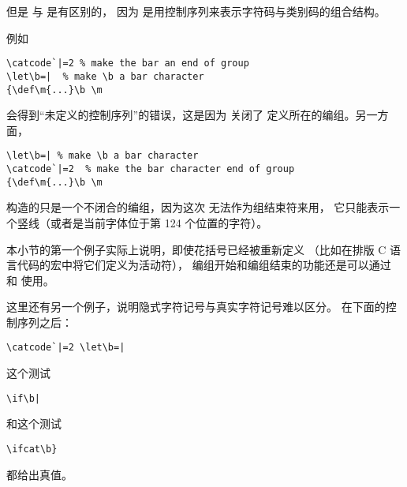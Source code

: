 \documentclass{book}
\begin{document}
但是  与  是有区别的，
因为  是用控制序列来表示字符码与类别码的组合结构。

例如
\begin{verbatim}
\catcode`|=2 % make the bar an end of group
\let\b=|  % make \b a bar character
{\def\m{...}\b \m
\end{verbatim}
会得到“未定义的控制序列”的错误，这是因为  关闭了 
定义所在的编组。另一方面，
\begin{verbatim}
\let\b=| % make \b a bar character
\catcode`|=2  % make the bar character end of group
{\def\m{...}\b \m
\end{verbatim}
构造的只是一个不闭合的编组，因为这次  无法作为组结束符来用，
它只能表示一个竖线（或者是当前字体位于第 124 个位置的字符）。

本小节的第一个例子实际上说明，即使花括号已经被重新定义%
（比如在排版 C 语言代码的宏中将它们定义为活动符），
编组开始和编组结束的功能还是可以通过  和  使用。

这里还有另一个例子，说明隐式字符记号与真实字符记号难以区分。
在下面的控制序列之后：
\begin{verbatim}
\catcode`|=2 \let\b=|
\end{verbatim}
这个测试
\begin{verbatim}
\if\b|
\end{verbatim}
和这个测试
\begin{verbatim}
\ifcat\b}
\end{verbatim}
都给出真值。
\end{document}
